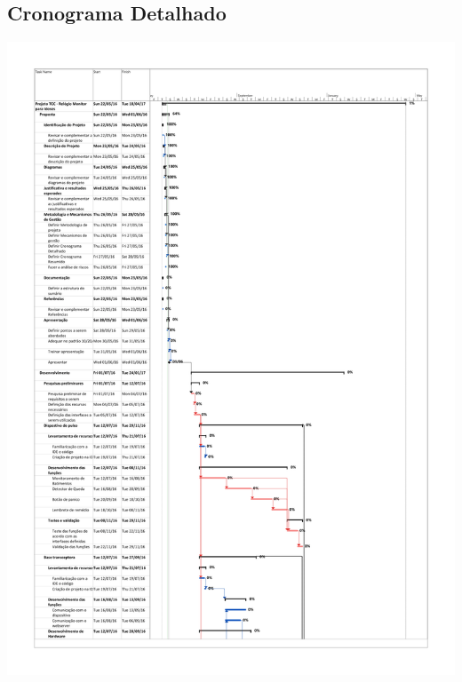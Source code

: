 \documentclass[a4paper]{article}
\begin{document}
\subsection{Cronograma Detalhado}
\begin{center}
\includegraphics[scale=0.29]{figuras/Cronograma-1.png}

\end{center}
\end{document}
